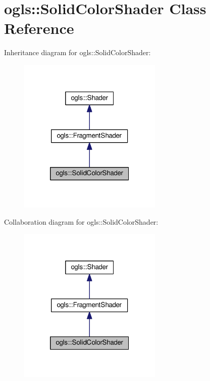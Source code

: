 \hypertarget{classogls_1_1SolidColorShader}{\section{ogls\-:\-:Solid\-Color\-Shader Class Reference}
\label{classogls_1_1SolidColorShader}
}


Inheritance diagram for ogls\-:\-:Solid\-Color\-Shader\-:\nopagebreak
\begin{figure}[H]
\begin{center}
\leavevmode
\includegraphics[width=194pt]{d0/d03/classogls_1_1SolidColorShader__inherit__graph}
\end{center}
\end{figure}


Collaboration diagram for ogls\-:\-:Solid\-Color\-Shader\-:\nopagebreak
\begin{figure}[H]
\begin{center}
\leavevmode
\includegraphics[width=194pt]{d7/d13/classogls_1_1SolidColorShader__coll__graph}
\end{center}
\end{figure}
